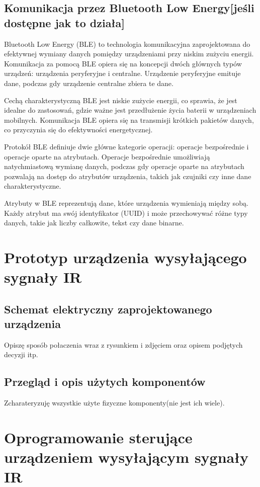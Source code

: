 \documentclass[12pt,twoside,draft]{article}
\begin{document}
\subsection{Komunikacja przez Bluetooth Low Energy[jeśli dostępne jak to działa]}
{Bluetooth Low Energy (BLE) to technologia komunikacyjna zaprojektowana do efektywnej wymiany danych pomiędzy urządzeniami przy niskim zużyciu energii.
Komunikacja za pomocą BLE opiera się na koncepcji dwóch głównych typów urządzeń: urządzenia peryferyjne i centralne. 
Urządzenie peryferyjne emituje dane, podczas gdy urządzenie centralne zbiera te dane.

Cechą charakterystyczną BLE jest niskie zużycie energii, co sprawia, że jest idealne do zastosowań, gdzie ważne jest przedłużenie życia baterii w urządzeniach mobilnych.
 Komunikacja BLE opiera się na transmisji krótkich pakietów danych, co przyczynia się do efektywności energetycznej.

Protokół BLE definiuje dwie główne kategorie operacji: operacje bezpośrednie i operacje oparte na atrybutach.
 Operacje bezpośrednie umożliwiają natychmiastową wymianę danych, podczas gdy operacje oparte na atrybutach 
pozwalają na dostęp do atrybutów urządzenia, takich jak czujniki czy inne dane charakterystyczne.

Atrybuty w BLE reprezentują dane, które urządzenia wymieniają między sobą. Każdy atrybut ma swój identyfikator 
(UUID) i może przechowywać różne typy danych, takie jak liczby całkowite, tekst czy dane binarne.}

\clearpage	

\section{Prototyp urządzenia wysyłającego sygnały IR}
\subsection{Schemat elektryczny zaprojektowanego urządzenia}
Opiszę sposób połaczenia wraz z rysunkiem i zdjęciem oraz opisem podjętych decyzji itp.
\subsection{Przegląd i opis użytych komponentów}
Zcharateryzuję wszystkie użyte fizyczne komponenty(nie jest ich wiele).
\clearpage

\section{Oprogramowanie sterujące urządzeniem wysyłającym sygnały IR}
\end{document}
